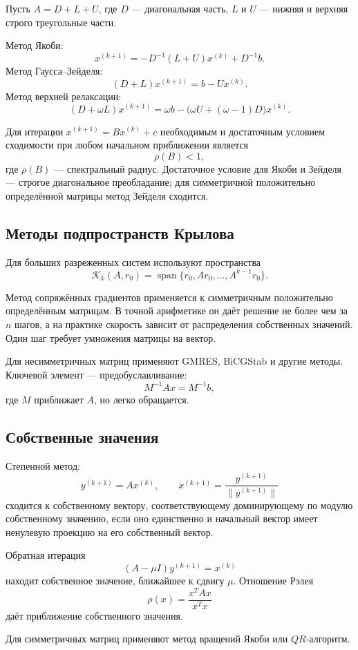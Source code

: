 Пусть $A=D+L+U$, где $D$ --- диагональная часть, $L$ и $U$ --- нижняя и верхняя
строго треугольные части.

Метод Якоби:
\[
    x^{(k+1)}=-D^{-1}(L+U)x^{(k)}+D^{-1}b.
\]
Метод Гаусса--Зейделя:
\[
    (D+L)x^{(k+1)}=b-Ux^{(k)}.
\]
Метод верхней релаксации:
\[
    (D+\omega L)x^{(k+1)}
    =\omega b-\bigl(\omega U+(\omega-1)D\bigr)x^{(k)}.
\]

Для итерации $x^{(k+1)}=Bx^{(k)}+c$ необходимым и достаточным условием сходимости
при любом начальном приближении является
\[
    \rho(B)<1,
\]
где $\rho(B)$ --- спектральный радиус. Достаточное условие для Якоби и Зейделя
--- строгое диагональное преобладание; для симметричной положительно определённой
матрицы метод Зейделя сходится.

\subsection{Методы подпространств Крылова}

Для больших разреженных систем используют пространства
\[
    \mathcal K_k(A,r_0)=
    \operatorname{span}\{r_0,Ar_0,\ldots,A^{k-1}r_0\}.
\]

Метод сопряжённых градиентов применяется к симметричным положительно определённым
матрицам. В точной арифметике он даёт решение не более чем за $n$ шагов, а на
практике скорость зависит от распределения собственных значений. Один шаг
требует умножения матрицы на вектор.

Для несимметричных матриц применяют GMRES, BiCGStab и другие методы. Ключевой
элемент --- предобуславливание:
\[
    M^{-1}Ax=M^{-1}b,
\]
где $M$ приближает $A$, но легко обращается.

\subsection{Собственные значения}

Степенной метод:
\[
    y^{(k+1)}=Ax^{(k)},
    \qquad
    x^{(k+1)}=\frac{y^{(k+1)}}{\|y^{(k+1)}\|}
\]
сходится к собственному вектору, соответствующему доминирующему по модулю
собственному значению, если оно единственно и начальный вектор имеет ненулевую
проекцию на его собственный вектор.

Обратная итерация
\[
    (A-\mu I)y^{(k+1)}=x^{(k)}
\]
находит собственное значение, ближайшее к сдвигу $\mu$. Отношение Рэлея
\[
    \rho(x)=\frac{x^TAx}{x^Tx}
\]
даёт приближение собственного значения.

Для симметричных матриц применяют метод вращений Якоби или $QR$-алгоритм.

